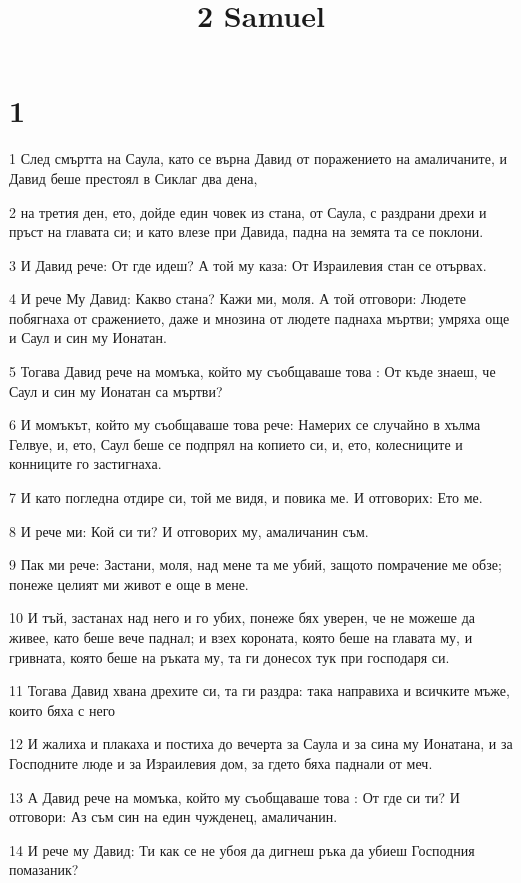 

\title{2 Samuel}


\chapter{1}

\par 1 След смъртта на Саула, като се върна Давид от поражението на амаличаните, и Давид беше престоял в Сиклаг два дена,
\par 2 на третия ден, ето, дойде един човек из стана, от Саула, с раздрани дрехи и пръст на главата си; и като влезе при Давида, падна на земята та се поклони.
\par 3 И Давид рече: От где идеш? А той му каза: От Израилевия стан се отървах.
\par 4 И рече Му Давид: Какво стана? Кажи ми, моля. А той отговори: Людете побягнаха от сражението, даже и мнозина от людете паднаха мъртви; умряха още и Саул и син му Ионатан.
\par 5 Тогава Давид рече на момъка, който му съобщаваше това : От къде знаеш, че Саул и син му Ионатан са мъртви?
\par 6 И момъкът, който му съобщаваше това рече: Намерих се случайно в хълма Гелвуе, и, ето, Саул беше се подпрял на копието си, и, ето, колесниците и конниците го застигнаха.
\par 7 И като погледна отдире си, той ме видя, и повика ме. И отговорих: Ето ме.
\par 8 И рече ми: Кой си ти? И отговорих му, амаличанин съм.
\par 9 Пак ми рече: Застани, моля, над мене та ме убий, защото помрачение ме обзе; понеже целият ми живот е още в мене.
\par 10 И тъй, застанах над него и го убих, понеже бях уверен, че не можеше да живее, като беше вече паднал; и взех короната, която беше на главата му, и гривната, която беше на ръката му, та ги донесох тук при господаря си.
\par 11 Тогава Давид хвана дрехите си, та ги раздра: така направиха и всичките мъже, които бяха с него
\par 12 И жалиха и плакаха и постиха до вечерта за Саула и за сина му Ионатана, и за Господните люде и за Израилевия дом, за гдето бяха паднали от меч.
\par 13 А Давид рече на момъка, който му съобщаваше това : От где си ти? И отговори: Аз съм син на един чужденец, амаличанин.
\par 14 И рече му Давид: Ти как се не убоя да дигнеш ръка да убиеш Господния помазаник?
